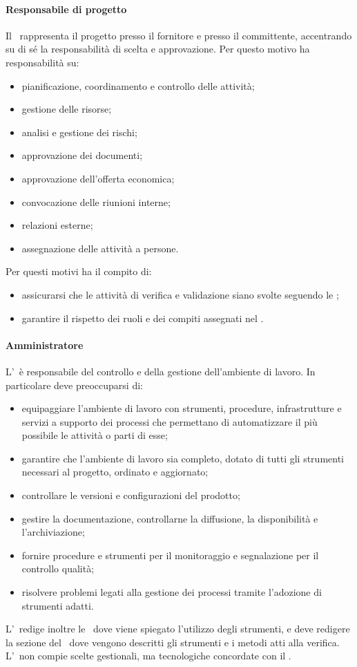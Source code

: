 \documentclass[../NormeProgetto.tex]{subfiles}
\begin{document}
		\paragraph{Responsabile di progetto}
			Il \responsabilediprogetto\ rappresenta il progetto presso il fornitore e presso il committente, accentrando su di sé la responsabilità di scelta e approvazione. Per questo motivo ha responsabilità su:
			\begin{itemize}
				\item pianificazione, coordinamento e controllo delle attività;
				\item gestione delle risorse;
				\item analisi e gestione dei rischi;
				\item approvazione dei documenti;
				\item approvazione dell'offerta economica;
				\item convocazione delle riunioni interne;
				\item relazioni esterne;
				\item assegnazione delle attività a persone.
			\end{itemize}
			Per questi motivi ha il compito di:
			\begin{itemize}
				\item assicurarsi che le attività di verifica e validazione siano svolte seguendo le \normediprogetto;
				\item garantire il rispetto dei ruoli e dei compiti assegnati nel \pianodiprogetto.
			\end{itemize}
		\paragraph{Amministratore}
			L'\amministratore\ è responsabile del controllo e della gestione dell'ambiente di lavoro. In particolare deve preoccuparsi di:
			\begin{itemize}
				\item equipaggiare l'ambiente di lavoro con strumenti, procedure, infrastrutture e servizi a supporto dei processi che permettano di automatizzare il più possibile le attività o parti di esse;
				\item garantire che l'ambiente di lavoro sia completo, dotato di tutti gli strumenti necessari al progetto, ordinato e aggiornato;
				\item controllare le versioni e configurazioni del prodotto\g;
				\item gestire la documentazione, controllarne la diffusione, la disponibilità e l'archiviazione;
				\item fornire procedure e strumenti per il monitoraggio e segnalazione per il controllo qualità;
				\item risolvere problemi legati alla gestione dei processi tramite l'adozione di strumenti adatti.
			\end{itemize}
			L'\amministratore\ redige inoltre le \normediprogetto\, dove viene spiegato l'utilizzo degli strumenti, e deve redigere la sezione del \pianodiqualifica\ dove vengono descritti gli strumenti e i metodi atti alla verifica. L'\amministratore\ non compie scelte gestionali, ma tecnologiche concordate con il \responsabilediprogetto.
\end{document}
